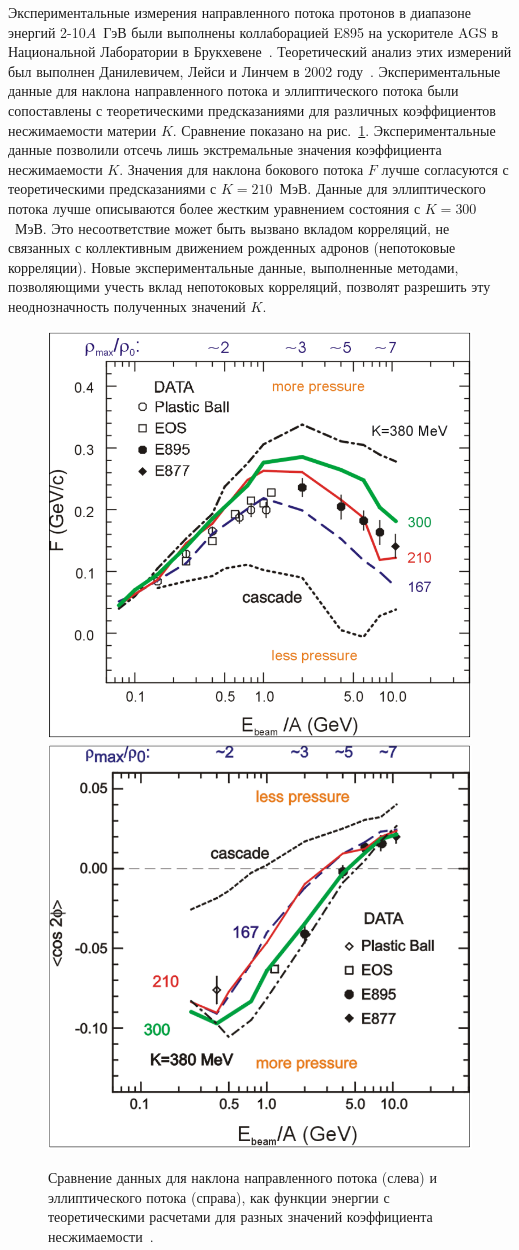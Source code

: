 Экспериментальные измерения направленного потока протонов в диапазоне энергий 2-10$A$~ГэВ были выполнены коллаборацией E895 на ускорителе AGS в Национальной Лаборатории в Брукхевене~\cite{E895:2000maf}. 
Теоретический анализ этих измерений был выполнен Данилевичем, Лейси и Линчем в 2002 году~\cite{Danielewicz:2002pu}.
Экспериментальные данные для наклона направленного потока и эллиптического потока были сопоставлены с теоретическими предсказаниями для различных коэффициентов несжимаемости материи $K$.
Сравнение показано на рис.~\ref{fig:Danilewicz}. 
Экспериментальные данные позволили отсечь лишь экстремальные значения коэффициента несжимаемости $K$.
Значения для наклона бокового потока $F$ лучше согласуются с теоретическими предсказаниями с $K=210$~МэВ. 
Данные для эллиптического потока лучше описываются более жестким уравнением состояния с $K=300$~МэВ.
Это несоответствие может быть вызвано вкладом корреляций, не связанных с коллективным движением рожденных адронов (непотоковые корреляции).
Новые экспериментальные данные, выполненные методами, позволяющими учесть вклад непотоковых корреляций, позволят разрешить эту неоднозначность полученных значений $K$.

\begin{figure}[h]
    \centering
    \includegraphics[width=0.45\linewidth]{images/Danilewicz_F_energy.png}
    \includegraphics[width=0.45\linewidth]{images/Danilewicz_Elliptic_energy.png}
    \caption{Сравнение данных для наклона направленного потока (слева) и эллиптического потока (справа), как функции энергии с теоретическими расчетами для разных значений коэффициента несжимаемости~\cite{Danielewicz:2002pu}.}
    \label{fig:Danilewicz}
\end{figure}


